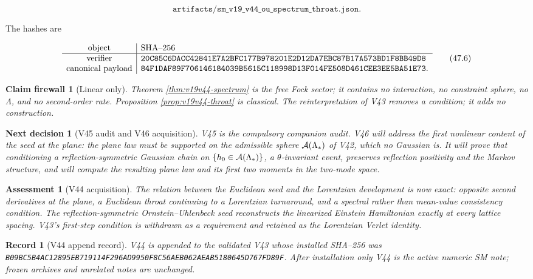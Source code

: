 \documentclass[11pt]{article}
\newtheorem{firewall}[theorem]{Claim firewall}
\newtheorem{decision}[theorem]{Next decision}
\newtheorem{assessment}[theorem]{Assessment}
\newtheorem{record}[theorem]{Record}
\theoremstyle{remark}
\begin{document}
\[
 \texttt{artifacts/sm\_v19\_v44\_ou\_spectrum\_throat.json}.        \tag{47.5}
\]

The hashes are

\[
\begin{array}{c|l}
\hbox{object}&\hbox{SHA--256}\\ \hline
\hbox{verifier}&
\texttt{20C85C6DACC42841E7A2BFC177B978201E2D12DA7EBC87B17A573BD1F8BB49D8}\\
\hbox{canonical payload}&
\texttt{84F1DAF89F706146184039B5615C118998D13F014FE508D461CEE3EE5BA51E73}.
\end{array}                                                     \tag{47.6}
\]

\begin{firewall}[Linear only]
\label{fire:v19v44}
Theorem \ref{thm:v19v44-spectrum} is the free Fock sector; it contains
no interaction, no constraint sphere, no \(\Lambda\), and no
second-order rate.  Proposition \ref{prop:v19v44-throat} is classical.
The reinterpretation of V43 removes a condition; it adds no
construction.
\end{firewall}

\begin{decision}[V45 audit and V46 acquisition]
\label{dec:v19v44-next}
V45 is the compulsory companion audit.  V46 will address the first
nonlinear content of the seed at the plane: the plane law must be
supported on the admissible sphere \({\cal A}(\Lambda_*)\) of V42, which
no Gaussian is.  It will prove that conditioning a reflection-symmetric
Gaussian chain on \(\{h_0\in{\cal A}(\Lambda_*)\}\), a \(\theta\)-invariant
event, preserves reflection positivity and the Markov structure, and
will compute the resulting plane law and its first two moments in the
two-mode space.
\end{decision}

\begin{assessment}[V44 acquisition]
\label{ass:v19v44}
The relation between the Euclidean seed and the Lorentzian development
is now exact: opposite second derivatives at the plane, a Euclidean
throat continuing to a Lorentzian turnaround, and a spectral rather
than mean-value consistency condition.  The reflection-symmetric
Ornstein--Uhlenbeck seed reconstructs the linearized Einstein
Hamiltonian exactly at every lattice spacing.  V43's first-step
condition is withdrawn as a requirement and retained as the Lorentzian
Verlet identity.
\end{assessment}

\begin{record}[V44 append record]
\label{rec:v19v44}
V44 is appended to the validated V43 whose installed SHA--256 was
\texttt{B09BC5B4AC12895EB719114F296AD9950F8C56AEB062AEAB5180645D767FD89F}.
After installation only V44 is the active numeric SM note; frozen
archives and unrelated notes are unchanged.
\end{record}
\end{document}
